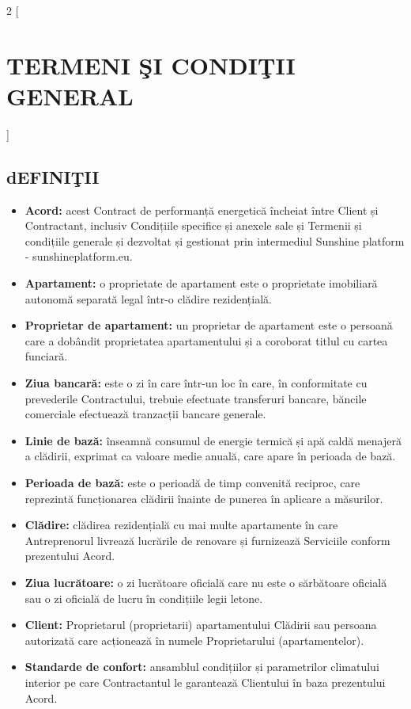 \begin{multicols}{2}
  [\section{TERMENI ŞI CONDIŢII GENERAL}]

\subsection{dEFINIŢII}
\begin{itemize}[label={}]
\item\textbf{Acord:} acest Contract de performanță energetică încheiat între Client și Contractant, inclusiv Condițiile specifice și anexele sale și Termenii și condițiile generale și dezvoltat și gestionat prin intermediul Sunshine platform - sunshineplatform.eu.
\item\textbf{Apartament:} o proprietate de apartament este o proprietate imobiliară autonomă separată legal într-o clădire rezidențială.
\item\textbf{Proprietar de apartament:} un proprietar de apartament este o persoană care a dobândit proprietatea apartamentului și a coroborat titlul cu cartea funciară.
\item\textbf{Ziua bancară:} este o zi în care într-un loc în care, în conformitate cu prevederile Contractului, trebuie efectuate transferuri bancare, băncile comerciale efectuează tranzacții bancare generale.
\item\textbf{Linie de bază:} înseamnă consumul de energie termică și apă caldă menajeră a clădirii, exprimat ca valoare medie anuală, care apare în perioada de bază.
\item\textbf{Perioada de bază:} este o perioadă de timp convenită reciproc, care reprezintă funcționarea clădirii înainte de punerea în aplicare a măsurilor.
\item\textbf{Clădire:} clădirea rezidențială cu mai multe apartamente în care Antreprenorul livrează lucrările de renovare și furnizează Serviciile conform prezentului Acord.
\item\textbf{Ziua lucrătoare:} o zi lucrătoare oficială care nu este o sărbătoare oficială sau o zi oficială de lucru în condițiile legii letone.
\item\textbf{Client:} Proprietarul (proprietarii) apartamentului Clădirii sau persoana autorizată care acționează în numele Proprietarului (apartamentelor).
\item\textbf{Standarde de confort:} ansamblul condițiilor și parametrilor climatului interior pe care Contractantul le garantează Clientului în baza prezentului Acord.

\end{itemize}
\end{multicols}
